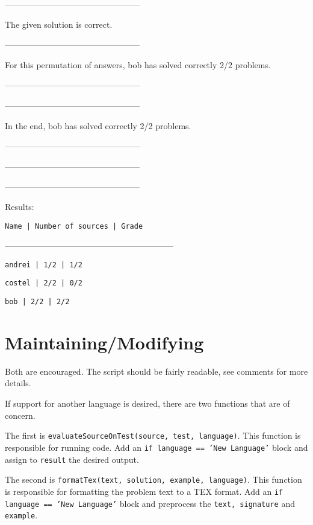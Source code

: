 \documentclass[a4paper,12pt]{article}
\begin{document}
\begin{itemize}
\begin{itemize}
------------------------------------------------

The given solution is correct.

------------------------------------------------

For this permutation of answers, bob has solved correctly 2/2 problems.

------------------------------------------------

------------------------------------------------

In the end, bob has solved correctly 2/2 problems.

------------------------------------------------

------------------------------------------------

------------------------------------------------

Results:

\texttt{Name                          | Number of sources   | Grade}

------------------------------------------------------------

\texttt{andrei                        | 1/2                 | 1/2}

\texttt{costel                        | 2/2                 | 0/2}

\texttt{bob                           | 2/2                 | 2/2}

   
 \end{itemize}
 
\end{itemize}


\section{Maintaining/Modifying}

Both are encouraged. The script should be fairly readable, see comments for more details. 

If support for another language is desired, there are two functions that are of concern. 

The first is \texttt{evaluateSourceOnTest(source, test, language)}. This function is responsible for running code. Add an \texttt{if language == 'New Language'} block and assign to \texttt{result} the desired output.

The second is \texttt{formatTex(text, solution, example, language)}. This function is responsible for formatting the problem text to a TEX format. Add an \texttt{if language == 'New Language'} block and preprocess the \texttt{text, signature} and \texttt{example}.
\end{document}
